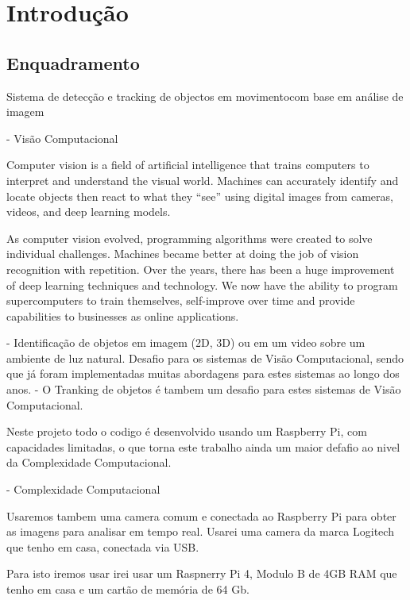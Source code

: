 \chapter{Introdução}
\label{chap:intro}


\section{Enquadramento}
\label{sec:amb}

Sistema de detecção e tracking de objectos em movimentocom base em análise de imagem

- Visão Computacional

Computer vision is a field of artificial intelligence that trains computers to interpret and understand the visual world. Machines can accurately identify and locate objects then react to what they “see” using digital images from cameras, videos, and deep learning models.

As computer vision evolved, programming algorithms were created to solve individual challenges. Machines became better at doing the job of vision recognition with repetition. Over the years, there has been a huge improvement of deep learning techniques and technology. We now have the ability to program supercomputers to train themselves, self-improve over time and provide capabilities to businesses as online applications.




- Identificação de objetos em imagem (2D, 3D) ou em um video sobre um ambiente de luz natural.
Desafio para os sistemas de Visão Computacional, sendo que já foram implementadas muitas abordagens para estes sistemas ao longo dos anos.
- O Tranking de objetos é tambem um desafio para estes sistemas de Visão Computacional.

Neste projeto todo o codigo é desenvolvido usando um Raspberry Pi, com capacidades limitadas, o que torna este trabalho ainda um maior defafio ao nivel da Complexidade Computacional.

- Complexidade Computacional 

Usaremos tambem uma camera comum e conectada ao Raspberry Pi para obter as imagens para analisar em tempo real. Usarei uma camera da marca Logitech que tenho em casa, conectada via USB.

Para isto iremos usar irei usar um Raspnerry Pi 4, Modulo B de 4GB RAM que tenho em casa e um cartão de memória de 64 Gb.

